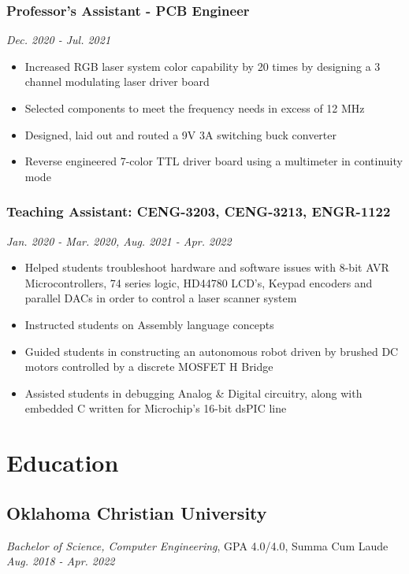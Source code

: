 \documentclass{article}
\begin{document}
\begin{spacing}{.5}
		\subsubsection{\large{Professor's Assistant - PCB Engineer}} \hfill \small{\textsl{Dec. 2020 - Jul. 2021}}
			\begin{itemize}[label=--,itemsep=-.35ex]
				\item \large{Increased RGB laser system color capability by 20 times by designing a 3 channel modulating laser driver board}
				\item \large{Selected components to meet the frequency needs in excess of 12 MHz}
				\item \large{Designed, laid out and routed a 9V 3A switching buck converter}
				\item \large{Reverse engineered 7-color TTL driver board using a multimeter in continuity mode}
			\end{itemize}
		\subsubsection{\large{Teaching Assistant: CENG-3203, CENG-3213, ENGR-1122}} \hfill \small{\textsl{Jan. 2020 - Mar. 2020, Aug. 2021 - Apr. 2022}}
			\begin{itemize}[label=--,itemsep=-.35ex]
				\item \large{Helped students troubleshoot hardware and software issues with 8-bit AVR Microcontrollers, 74 series logic, HD44780 LCD's, Keypad encoders and parallel DACs in order to control a laser scanner system}
				\item \large{Instructed students on Assembly language concepts}
				\item \large{Guided students in constructing an autonomous robot driven by brushed DC motors controlled by a discrete MOSFET H Bridge}
				\item \large{Assisted students in debugging Analog \& Digital circuitry, along with embedded C written for Microchip's 16-bit dsPIC line}
			\end{itemize}

\section{Education}
	\subsection{Oklahoma Christian University}
		\hspace*{.35cm} \textit{Bachelor of Science, Computer Engineering}, GPA 4.0/4.0, Summa Cum Laude \hfill \small{\textsl{Aug. 2018 - Apr. 2022}}


\end{spacing}
\end{document}
